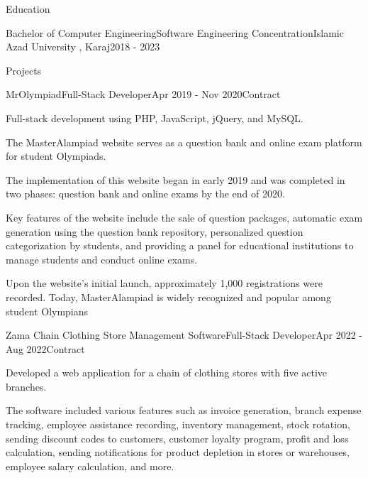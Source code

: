 \documentclass[]{kyvernitis-resume}
\begin{document}
\begin{section}{Education}

   \begin{subsectionnobullet}{Bachelor of Computer Engineering}{Software Engineering Concentration}{Islamic Azad University , Karaj}{2018 - 2023}
    \end{subsectionnobullet}
    
\end{section}

\begin{section}{Projects}
    \begin{subsection}{MrOlympiad}{Full-Stack Developer}{Apr 2019 - Nov 2020}{Contract}{}
     		\item Full-stack development using PHP, JavaScript, jQuery, and MySQL.
		\item	The MasterAlampiad website serves as a question bank and online exam platform for student Olympiads.
		\item	The implementation of this website began in early 2019 and was completed in two phases: question bank and online exams by the end of 2020.
		\item	Key features of the website include the sale of question packages, automatic exam generation using the question bank repository, personalized question categorization by students, and providing a panel for educational institutions to manage students and conduct online exams.
		\item	Upon the website's initial launch, approximately 1,000 registrations were recorded. Today, MasterAlampiad is widely recognized and popular among student Olympians

    \end{subsection}
    \begin{subsection}{Zama Chain Clothing Store Management Software}{Full-Stack Developer}{Apr 2022 - Aug 2022}{Contract}{}
     		\item Developed a web application for a chain of clothing stores with five active branches.
		\item The software included various features such as invoice generation, branch expense tracking, employee assistance recording, inventory management, stock rotation, sending discount codes to customers, customer loyalty program, profit and loss calculation, sending notifications for product depletion in stores or warehouses, employee salary calculation, and more.


\end{subsection}
\end{section}
\end{document}
